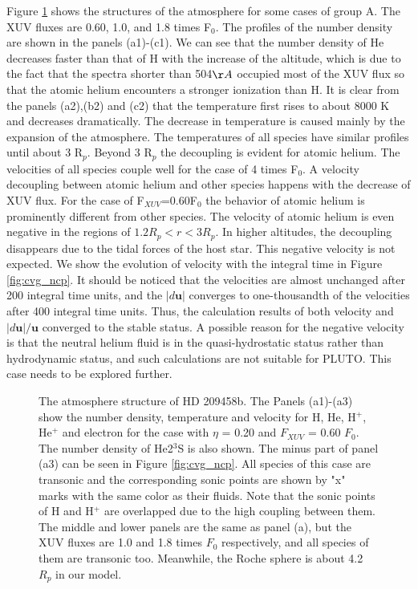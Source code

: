 \documentclass[journal, onecolumn]{aastex631}
\begin{document}
\begin{CJK*}{UTF8}{gbsn}
Figure \ref{fig:struc} shows the structures of the atmosphere for some cases of group A. The XUV fluxes are 0.60, 1.0, and 1.8 times F$_{0}$. The profiles of the number density are shown in the panels (a1)-(c1). We can see that the number density of He decreases faster than that of H with the increase of the altitude, which is due to the fact that the spectra shorter than 504$\AA$ occupied most of the XUV flux so that the atomic helium encounters a stronger ionization than H. It is clear from the panels (a2),(b2) and (c2) that the temperature first rises to about 8000 K and decreases dramatically. The decrease in temperature is caused mainly by the expansion of the atmosphere. The temperatures of all species have similar profiles until about 3 R$_{p}$. Beyond 3 R$_{p}$ the decoupling is evident for atomic helium. The velocities of all species couple well for the case of 4 times F$_{0}$. A velocity decoupling between atomic helium and other species happens with the decrease of XUV flux. For the case of F$_{XUV}$=0.60F$_{0}$ the behavior of atomic helium is prominently different from other species. The velocity of atomic helium is even negative in the regions of $1.2R_{p}<r<3R_{p}$. In higher altitudes, the decoupling disappears due to the tidal forces of the host star. This negative velocity is not expected. We show the evolution of velocity with the integral time in Figure \ref{fig:cvg_ncp}. It should be noticed that the velocities are almost unchanged after 200 integral time units, and the $|d\textbf{u}|$ converges to one-thousandth of the velocities after 400 integral time units. Thus, the calculation results of both velocity and $|d\textbf{u}|/\textbf{u}$ converged to the stable status. A possible reason for the negative velocity is that the neutral helium fluid is in the quasi-hydrostatic status rather than hydrodynamic status, and such calculations are not suitable for PLUTO. This case needs to be explored further.

\begin{figure}[ht!]
\caption{The atmosphere structure of HD 209458b. The Panels (a1)-(a3) show the number density, temperature and velocity for H, He, H$^+$, He$^+$ and electron for the case with $\eta$ = 0.20 and $F_{XUV}$ =  0.60 $F_{0}$. The number density of He2$^3$S is also shown. The minus part of panel (a3) can be seen in Figure \ref{fig:cvg_ncp}. All species of this case are transonic and the corresponding sonic points are shown by "x" marks with the same color as their fluids. Note that the sonic points of H and H$^+$ are overlapped due to the high coupling between them. The middle and lower panels are the same as panel (a), but the XUV fluxes are 1.0 and 1.8 times $F_{0}$ respectively, and all species of them are transonic too. Meanwhile, the Roche sphere is about 4.2 $R_p$ in our model.} \label{fig:struc}
\end{figure}


\end{CJK*}
\end{document}
